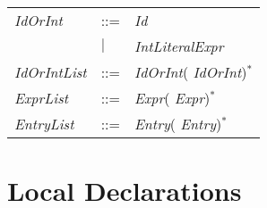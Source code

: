 \begin{tabular}{lll}
\emph{IdOrInt} &::=& \emph{Id}\\
&$|$& \emph{IntLiteralExpr}\\

\emph{IdOrIntList} &::=& \emph{IdOrInt}(\EXP{,} \emph{IdOrInt})$^*$ \\

\emph{ExprList} &::=& \emph{Expr}(\EXP{,} \emph{Expr})$^*$ \\

\emph{EntryList} &::=& \emph{Entry}(\EXP{,} \emph{Entry})$^*$ \\

\end{tabular}

\section{Local Declarations}
